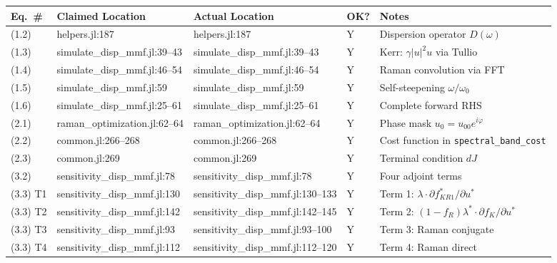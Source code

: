 \documentclass[12pt,a4paper]{article}
\theoremstyle{definition}
\begin{document}
{\small
\begin{longtable}{p{1.6cm}p{3.5cm}p{3.5cm}p{0.7cm}p{3.5cm}}
\toprule
\textbf{Eq.\ \#} & \textbf{Claimed Location} & \textbf{Actual Location} & \textbf{OK?} & \textbf{Notes} \\
\midrule
\endhead

(1.2) & helpers.jl:187 & helpers.jl:187 & Y & Dispersion operator $D(\omega)$ \\

(1.3) & simulate\_disp\_mmf.jl:39--43 & simulate\_disp\_mmf.jl:39--43 & Y & Kerr: $\gamma|u|^2 u$ via Tullio \\

(1.4) & simulate\_disp\_mmf.jl:46--54 & simulate\_disp\_mmf.jl:46--54 & Y & Raman convolution via FFT \\

(1.5) & simulate\_disp\_mmf.jl:59 & simulate\_disp\_mmf.jl:59 & Y & Self-steepening $\omega/\omega_0$ \\

(1.6) & simulate\_disp\_mmf.jl:25--61 & simulate\_disp\_mmf.jl:25--61 & Y & Complete forward RHS \\

(2.1) & raman\_optimization.jl:62--64 & raman\_optimization.jl:62--64 & Y & Phase mask $u_0 = u_{00}e^{i\varphi}$ \\

(2.2) & common.jl:266--268 & common.jl:266--268 & Y & Cost function in \texttt{spectral\_band\_cost} \\

(2.3) & common.jl:269 & common.jl:269 & Y & Terminal condition $dJ$ \\

(3.2) & sensitivity\_disp\_mmf.jl:78 & sensitivity\_disp\_mmf.jl:78 & Y & Four adjoint terms \\

(3.3) T1 & sensitivity\_disp\_mmf.jl:130 & sensitivity\_disp\_mmf.jl:130--133 & Y & Term 1: $\lambda\cdot\partial f_{KR1}^*/\partial u^*$ \\

(3.3) T2 & sensitivity\_disp\_mmf.jl:142 & sensitivity\_disp\_mmf.jl:142--145 & Y & Term 2: $(1-f_R)\lambda^*\cdot\partial f_K/\partial u^*$ \\

(3.3) T3 & sensitivity\_disp\_mmf.jl:93 & sensitivity\_disp\_mmf.jl:93--100 & Y & Term 3: Raman conjugate \\

(3.3) T4 & sensitivity\_disp\_mmf.jl:112 & sensitivity\_disp\_mmf.jl:112--120 & Y & Term 4: Raman direct \\


\end{longtable}}
\end{document}
